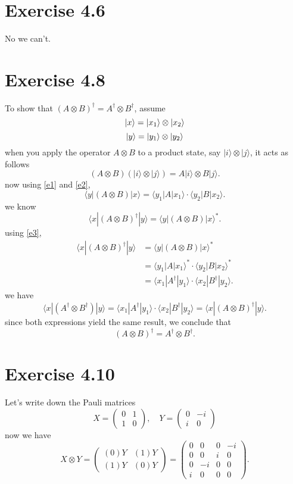\documentclass[12pt]{article}
\begin{document}
\section*{Exercise 4.6}
No we can't.
\section*{Exercise 4.8}
To show that \((A \otimes B)^\dagger = A^\dagger \otimes B^\dagger\), assume
\begin{equation}
    \label{e1}
    \ket{x} = \ket{x_1} \otimes \ket{x_2}
\end{equation}
\begin{equation}
    \label{e2}
    \ket{y} = \ket{y_1} \otimes \ket{y_2}
\end{equation}
when you apply the operator \(A \otimes B\) to a product state, say \(|i\rangle \otimes |j\rangle\), it acts as follows
\[
(A \otimes B)(|i\rangle \otimes |j\rangle) = A|i\rangle \otimes B|j\rangle.
\]
now using \ref{e1} and \ref{e2},
\begin{equation}
\label{e3}
\langle y | (A \otimes B) | x \rangle = \langle y_1 | A | x_1 \rangle \cdot \langle y_2 | B | x_2 \rangle.    
\end{equation}
we know
\[
\langle x | (A \otimes B)^\dagger | y \rangle = \langle y | (A \otimes B) | x \rangle^*.
\]
using \ref{e3},
\begin{align*}
\langle x | (A \otimes B)^\dagger | y \rangle &= \langle y | (A \otimes B) | x \rangle^* \\
&= \langle y_1 | A | x_1 \rangle^* \cdot \langle y_2 | B | x_2 \rangle^* \\  
&= \langle x_1 | A^\dagger | y_1 \rangle \cdot \langle x_2 | B^\dagger | y_2 \rangle.
\end{align*}
we have
\[
\langle x | (A^\dagger \otimes B^\dagger) | y \rangle = \langle x_1 | A^\dagger | y_1 \rangle \cdot \langle x_2 | B^\dagger | y_2 \rangle = \langle x | (A \otimes B)^\dagger | y \rangle.
\]
since both expressions yield the same result, we conclude that
\[
(A \otimes B)^\dagger = A^\dagger \otimes B^\dagger.
\]
\section*{Exercise 4.10}
Let's write down the Pauli matrices
\[
X = \begin{pmatrix} 0 & 1 \\ 1 & 0 \end{pmatrix}, \quad Y = \begin{pmatrix} 0 & -i \\ i & 0 \end{pmatrix}
\]
now we have
\[
X \otimes Y = 
\begin{pmatrix}
(0)Y & (1)Y \\
(1)Y & (0)Y
\end{pmatrix}
=
\begin{pmatrix}
0 & 0 & 0 & -i \\
0 & 0 & i & 0 \\
0 & -i & 0 & 0 \\
i & 0 & 0 & 0
\end{pmatrix}.
\]
\end{document}
